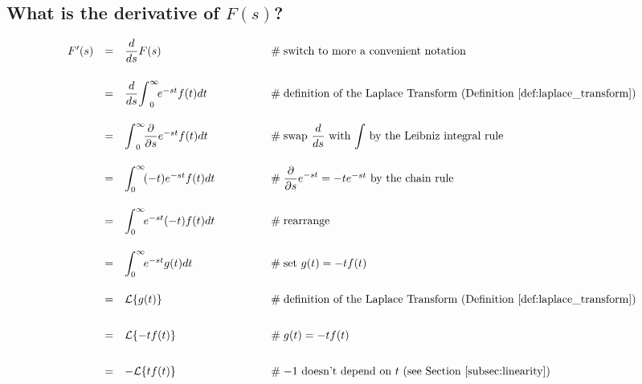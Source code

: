 \documentclass{article}
\theoremstyle{definition}
\begin{document}
\subsection{What is the derivative of $F(s)$?}

\bigskip
\begin{equation*}
\begin{array}{lllll}
F^\prime(s)
&=& \dfrac{d}{ds} F(s)                                                                                        &\qquad \qquad \mathrel{\#} \text{switch to more a convenient notation}                                                                    \\
[20pt]
&=& \dfrac{d}{ds} \mathlarger{\int} ^\infty_0 \! e^{-st}  f(t) dt                              &\qquad \qquad \mathrel{\#} \text{definition of the Laplace Transform (Definition \ref{def:laplace_transform})}          \\  
[20pt]
&=& \mathlarger{\int} ^\infty_0 \! \dfrac{\partial}{\partial s} e^{-st}  f(t) dt           &\qquad \qquad \mathrel{\#} \text{swap $\dfrac{d}{ds}$ with $\mathlarger{\int}$ by the Leibniz integral rule}             \\                                                                                    
[20pt]
&=&  \mathlarger{\int}^\infty_0 \! (-t) e^{-st} f(t) dt                                             &\qquad \qquad \mathrel{\#} \mathlarger{\dfrac{\partial}{\partial s} e^{-st}} = -t e^{-st} \text{ by the chain rule}            \\
[20pt]
&=&  \mathlarger{\int}^\infty_0 \! e^{-st}  (-t) f(t) dt                                            &\qquad \qquad \mathrel{\#} \text{rearrange}                                                                                                                \\
[20pt]
&=&  \mathlarger{\int}^\infty_0 \! e^{-st} g(t) dt                                                  &\qquad \qquad \mathrel{\#} \text{set $g(t) = -t f(t)$}                                                                                                    \\
[20pt] 
&=& \mathcal{L}\{g(t)\}                                                                                      &\qquad \qquad \mathrel{\#} \text{definition of the Laplace Transform (Definition \ref{def:laplace_transform})}          \\
[20pt]
&=& \mathcal{L}\{-tf(t)\}                                                                                     &\qquad \qquad \mathrel{\#} g(t) = -t f(t)                                                                                                                       \\
[20pt]
&=& -\mathcal{L}\{tf(t)\}                                                                                    &\qquad \qquad \mathrel{\#} \text{$-1$ doesn't depend on $t$ (see Section \ref{subsec:linearity})}
\end{array}
\end{equation*}
\end{document}
